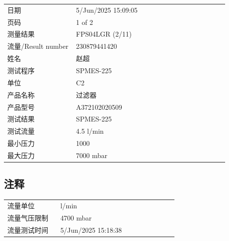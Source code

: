 \documentclass[UTF8,10pt,a4paper,fontset=fandol]{ctexart}
\newcommand{\fieldvalue}[1]{#1}
\begin{document}
\begin{tabular}{@{}p{0.28\linewidth}p{0.62\linewidth}@{}}
日期 &
\fieldvalue{5/Jun/2025 15:09:05}
\\
页码 &
\fieldvalue{1 of 2}
\\
测量结果 &
\fieldvalue{FPS04LGR (2/11)}
\\
流量/Result number &
\fieldvalue{230879441420}
\\
姓名 &
\fieldvalue{赵超}
\\
测试程序 &
\fieldvalue{SPMES-225}
\\
单位 &
\fieldvalue{C2}
\\
产品名称 &
\fieldvalue{过滤器}
\\
产品型号 &
\fieldvalue{A372102020509}
\\
测试结果 &
\fieldvalue{SPMES-225}
\\
测试流量 &
\fieldvalue{4.5 l/min}
\\
最小压力 &
\fieldvalue{1000}
\\
最大压力 &
\fieldvalue{7000 mbar}
\end{tabular}

\subsection{注释}

\begin{tabular}{@{}p{0.28\linewidth}p{0.62\linewidth}@{}}
流量单位 &
\fieldvalue{l/min}
\\
流量气压限制 &
\fieldvalue{4700 mbar}
\\
流量测试时间 &
\fieldvalue{5/Jun/2025 15:18:38}
\end{tabular}
\end{document}
